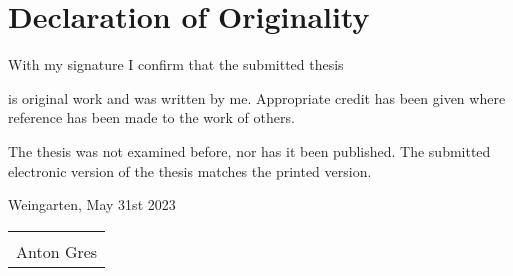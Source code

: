 \thispagestyle{empty} %
\section*{Declaration of Originality}

With my signature I confirm that the submitted thesis 

\large \batitle \normalsize

is original work and was written by me. Appropriate credit has been given where reference has been made to the work of others.

The thesis was not examined before, nor has it been published. The submitted electronic version of the thesis matches the printed version.

\mydate
Weingarten, May 31st 2023

\vspace{2cm}

\begin{tabular}{p{6cm}}
\hrulefill \\
\centering Anton Gres\\
\end{tabular}